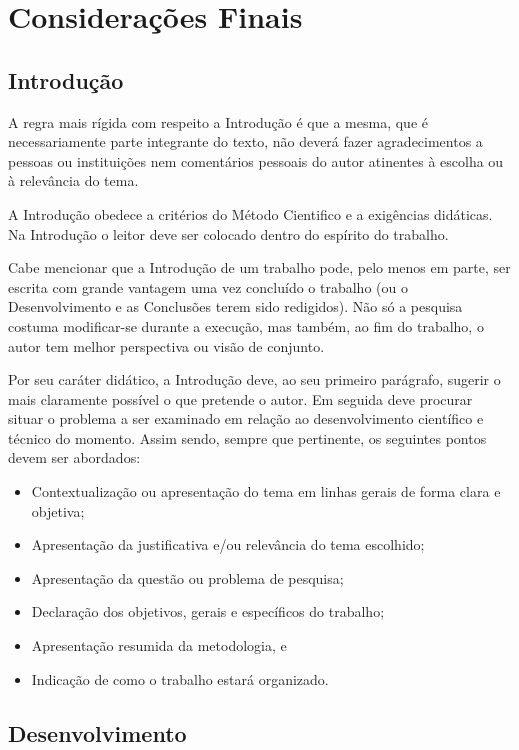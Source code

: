 \chapter[Considerações Finais]{Considerações Finais}

\section{Introdução}

A regra mais rígida com respeito a Introdução é que a mesma, que é
necessariamente parte integrante do texto, não deverá fazer agradecimentos
a pessoas ou instituições nem comentários pessoais do autor atinentes à
escolha ou à relevância do tema.

A Introdução obedece a critérios do Método Cientifico e a exigências
didáticas. Na Introdução o leitor deve ser colocado dentro do espírito do
trabalho.

Cabe mencionar que a Introdução de um trabalho pode, pelo menos em parte,
ser escrita com grande vantagem uma vez concluído o trabalho (ou o
Desenvolvimento e as Conclusões terem sido redigidos). Não só a pesquisa
costuma modificar-se durante a execução, mas também, ao fim do trabalho, o
autor tem melhor perspectiva ou visão de conjunto.

Por seu caráter didático, a Introdução deve, ao seu primeiro parágrafo,
sugerir o mais claramente possível o que pretende o autor. Em seguida deve
procurar situar o problema a ser examinado em relação ao desenvolvimento
científico e técnico do momento. Assim sendo, sempre que pertinente, os
seguintes pontos devem ser abordados:

\begin{itemize}

	\item Contextualização ou apresentação do tema em linhas gerais de
	          forma clara e objetiva;
	\item Apresentação da justificativa e/ou relevância do tema escolhido;
	\item Apresentação da questão ou problema de pesquisa;
	\item Declaração dos objetivos, gerais e específicos do trabalho;
	\item Apresentação resumida da metodologia, e
	\item Indicação de como o trabalho estará organizado.

\end{itemize}

\section{Desenvolvimento}

